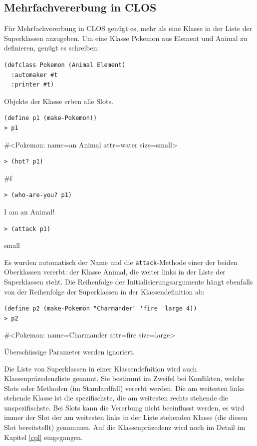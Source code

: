\subsection{Mehrfachvererbung in CLOS}
Für Mehrfachvererbung in CLOS genügt es, mehr als eine Klasse in der Liste der Superklassen anzugeben. Um eine Klasse Pokemon aus Element und Animal zu definieren, genügt es schreiben:

\begin{lstlisting}
(defclass Pokemon (Animal Element)
  :automaker #t
  :printer #t)
\end{lstlisting}

Objekte der Klasse erben alle Slots.

\begin{lstlisting}
(define p1 (make-Pokemon))
> p1
\end{lstlisting}
{\routput \#<Pokemon: name={\qq}an Animal{\qq} attr=water size=small>}

\begin{lstlisting}
> (hot? p1)
\end{lstlisting}
{\routput \#f}

\begin{lstlisting}
> (who-are-you? p1)
\end{lstlisting}
{\routput {\qq}I am an Animal!\qq}

\begin{lstlisting}
> (attack p1)
\end{lstlisting}
{\rsymbol small}

Es wurden automatisch der Name und die \texttt{attack}-Methode einer der beiden Oberklassen vererbt: der Klasse Animal, die weiter links in der Liste der Superklassen steht. Die Reihenfolge der Initialisierungsargumente hängt ebenfalls von der Reihenfolge der Superklassen in der Klassendefinition ab:

\begin{lstlisting}
(define p2 (make-Pokemon "Charmander" 'fire 'large 4))
> p2
\end{lstlisting}
{\routput \#<Pokemon: name={\qq}Charmander{\qq} attr=fire size=large>}

Überschüssige Parameter werden ignoriert.

Die Liste von Superklassen in einer Klassendefnition wird auch Klassenpräzedenzliste genannt. Sie bestimmt im Zweifel bei Konflikten, welche Slots oder Methoden (im Standardfall) vererbt werden. Die am weitesten links stehende Klasse ist die spezifischste, die am weitesten rechts stehende die unspezifischste. Bei Slots kann die Vererbung nicht beeinflusst werden, es wird immer der Slot der am weitesten links in der Liste stehenden Klasse (die diesen Slot bereitstellt) genommen. Auf die Klassenpräzedenz wird noch im Detail im Kapitel \ref{cpl} eingegangen.


